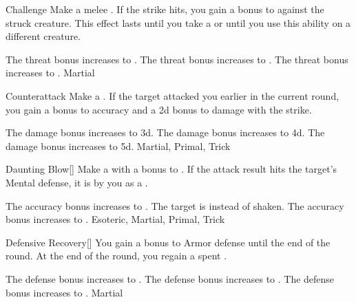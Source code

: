 \lowercase{\hypertarget{maneuver:Challenge}{}}\label{maneuver:Challenge}
\begin{freeability}{\hypertarget{maneuver:Challenge}{Challenge}}
Make a melee .
If the strike hits, you gain a  bonus to  against the struck creature.
This effect lasts until you take a  or until you use this ability on a different creature.

\rankline
{} The threat bonus increases to .
 The threat bonus increases to .
 The threat bonus increases to .
 Martial
\end{freeability}
\vspace{0.25em}



\lowercase{\hypertarget{maneuver:Counterattack}{}}\label{maneuver:Counterattack}
\begin{apability}{\hypertarget{maneuver:Counterattack}{Counterattack}}
Make a .
If the target attacked you earlier in the current round, you gain a  bonus to accuracy and a \plus2d bonus to damage with the strike.

\rankline
{} The damage bonus increases to \plus3d.
 The damage bonus increases to \plus4d.
 The damage bonus increases to \plus5d.
 Martial, Primal, Trick
\end{apability}
\vspace{0.25em}



\lowercase{\hypertarget{maneuver:Daunting Blow}{}}\label{maneuver:Daunting Blow}
\begin{apability}{\hypertarget{maneuver:Daunting Blow}{Daunting Blow}}[]
Make a  with a  bonus to .
If the attack result hits the target's Mental defense,
it is  by you as a .

\rankline
{} The accuracy bonus increases to .
 The target is  instead of shaken.
 The accuracy bonus increases to .
 Esoteric, Martial, Primal, Trick
\end{apability}
\vspace{0.25em}



\lowercase{\hypertarget{maneuver:Defensive Recovery}{}}\label{maneuver:Defensive Recovery}
\begin{freeability}{\hypertarget{maneuver:Defensive Recovery}{Defensive Recovery}}[]
You gain a  bonus to Armor defense until the end of the round.
At the end of the round, you regain a spent .

\rankline
{} The defense bonus increases to .
 The defense bonus increases to .
 The defense bonus increases to .
 Martial
\end{freeability}
\vspace{0.25em}



